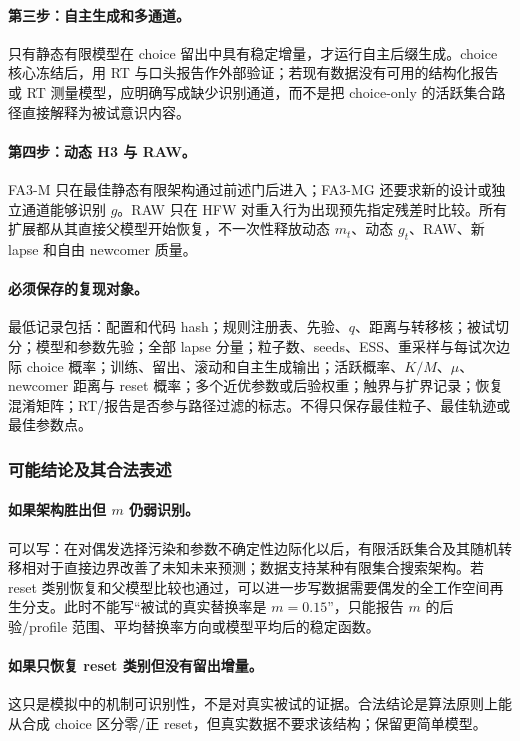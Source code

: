 \paragraph{第三步：自主生成和多通道。}
只有静态有限模型在 choice 留出中具有稳定增量，才运行自主后缀生成。choice 核心冻结后，用 RT 与口头报告作外部验证；若现有数据没有可用的结构化报告或 RT 测量模型，应明确写成缺少识别通道，而不是把 choice-only 的活跃集合路径直接解释为被试意识内容。

\paragraph{第四步：动态 H3 与 RAW。}
FA3-M 只在最佳静态有限架构通过前述门后进入；FA3-MG 还要求新的设计或独立通道能够识别 $g$。RAW 只在 HFW 对重入行为出现预先指定残差时比较。所有扩展都从其直接父模型开始恢复，不一次性释放动态 $m_t$、动态 $g_t$、RAW、新 lapse 和自由 newcomer 质量。

\paragraph{必须保存的复现对象。}
最低记录包括：配置和代码 hash；规则注册表、先验、$q$、距离与转移核；被试切分；模型和参数先验；全部 lapse 分量；粒子数、seeds、ESS、重采样与每试次边际 choice 概率；训练、留出、滚动和自主生成输出；活跃概率、$K/M$、$\mu$、newcomer 距离与 reset 概率；多个近优参数或后验权重；触界与扩界记录；恢复混淆矩阵；RT/报告是否参与路径过滤的标志。不得只保存最佳粒子、最佳轨迹或最佳参数点。


\subsubsection{可能结论及其合法表述}

\paragraph{如果架构胜出但 $m$ 仍弱识别。}
可以写：在对偶发选择污染和参数不确定性边际化以后，有限活跃集合及其随机转移相对于直接边界改善了未知未来预测；数据支持某种有限集合搜索架构。若 reset 类别恢复和父模型比较也通过，可以进一步写数据需要偶发的全工作空间再生分支。此时不能写“被试的真实替换率是 $m=0.15$”，只能报告 $m$ 的后验/profile 范围、平均替换率方向或模型平均后的稳定函数。

\paragraph{如果只恢复 reset 类别但没有留出增量。}
这只是模拟中的机制可识别性，不是对真实被试的证据。合法结论是算法原则上能从合成 choice 区分零/正 reset，但真实数据不要求该结构；保留更简单模型。

